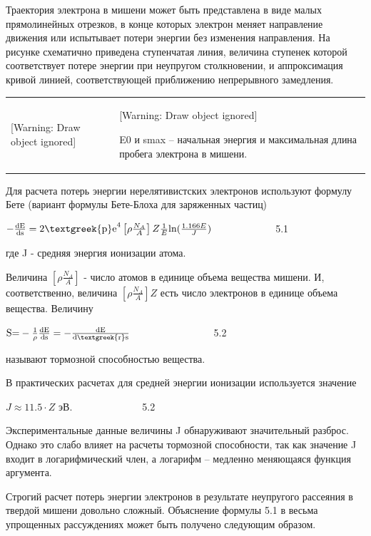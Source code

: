 \documentclass[a4paper,14pt, openany, twoside, draft]{extbook} %
\begin{document}
Траектория электрона в мишени может быть представлена в виде малых прямолинейных отрезков, в конце которых электрон меняет направление движения или испытывает потери энергии без изменения направления. На рисунке схематично приведена ступенчатая линия, величина ступенек которой соответствует потере энергии при неупругом столкновении, и аппроксимация кривой линией, соответствующей приближению непрерывного замедления.

\begin{flushleft}
\tablefirsthead{}
\tablehead{}
\tabletail{}
\tablelasttail{}
\begin{supertabular}{m{7.4290004cm}m{8.940001cm}}
{ [Warning: Draw object ignored]} &
{ [Warning: Draw object ignored]}

{ E0 и smax – начальная энергия и максимальная длина пробега электрона в мишени. }\\
\end{supertabular}
\end{flushleft}
Для расчета потерь энергии нерелятивистских электронов используют формулу Бете (вариант формулы Бете-Блоха для заряженных частиц)

 $-\frac{{\text{dE}}}{{\text{ds}}}=2{\text{\textgreek{p}e}}^4\left[\rho \frac{N_A} A\right]Z\frac 1 E\text{ln}(\frac{1.166E} J)$ \ \ \ \ \ \ \ \ \ \ \ \ 5.1

где J - средняя энергия ионизации атома.

Величина  $\left[\rho \frac{N_A} A\right]$ - число атомов в единице объема вещества мишени. И, соответственно, величина  $\left[\rho \frac{N_A} A\right]Z$ есть число электронов в единице объема вещества. Величину

 ${\text{S=}}-\frac 1{\rho }\frac{{\text{dE}}}{{\text{ds}}}=-\frac{{\text{dE}}}{{\text{d\textgreek{r}s}}}$ \ \ \ \ \ \ \ \ \ \ \ \ \ \ \ \ 5.2

называют тормозной способностью вещества.

В практических расчетах для средней энергии ионизации используется значение

 $J\approx 11.5\cdot Z$ эВ.\ \ \ \ \ \ \ \ \ \ \ \ \ \ 5.2

Экспериментальные данные величины J обнаруживают значительный разброс. Однако это слабо влияет на расчеты тормозной способности, так как значение J входит в логарифмический член, а логарифм – медленно меняющаяся функция аргумента.

Строгий расчет потерь энергии электронов в результате неупругого рассеяния в твердой мишени довольно сложный. Объяснение формулы 5.1 в весьма упрощенных рассуждениях может быть получено следующим образом.
\end{document}
